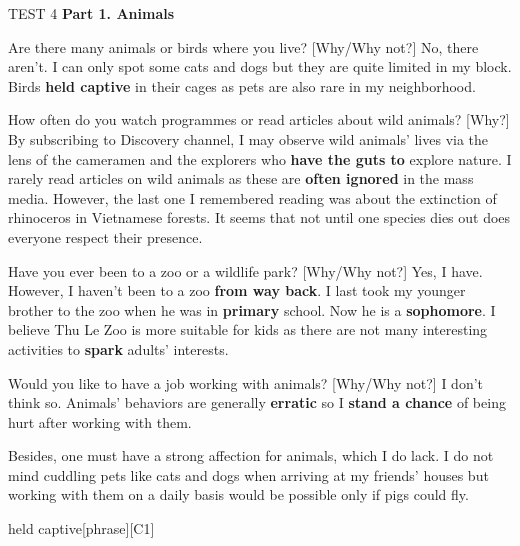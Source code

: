 \begin{glossarymc}[Cambridge 13]
    \begin{test}{TEST 4}
    \noindent
    \textbf{Part 1. Animals}
    \begin{qa}{Are there many animals or birds where you live? [Why/Why not?]}
    No, there aren’t. I can only spot some cats and dogs but they are quite limited in my block. Birds \textbf{held captive} in their cages as pets are also rare in my neighborhood.
    \end{qa}

    \begin{qa}{How often do you watch programmes or read articles about wild animals? [Why?]}
    By subscribing to Discovery channel, I may observe wild animals’ lives via the lens of the cameramen and the explorers who \textbf{have the guts to} explore nature. I rarely read articles on wild animals as these are \textbf{often ignored} in the mass media. However, the last one I remembered reading was about the extinction of rhinoceros in Vietnamese forests. It seems that not until one species dies out does everyone respect their presence.
    \end{qa}

    \begin{qa}{Have you ever been to a zoo or a wildlife park? [Why/Why not?]}
    Yes, I have. However, I haven’t been to a zoo \textbf{from way back}. I last took my younger brother to the zoo when he was in \textbf{primary} school. Now he is a \textbf{sophomore}. I believe Thu Le Zoo is more suitable for kids as there are not many interesting activities to \textbf{spark} adults’ interests.
    \end{qa}

    \begin{qa}{Would you like to have a job working with animals? [Why/Why not?]}
    I don’t think so. Animals’ behaviors are generally \textbf{erratic} so I \textbf{stand a chance} of being hurt after working with them. 

    Besides, one must have a strong affection for animals, which I do lack. I do not mind cuddling pets like cats and dogs when arriving at my friends’ houses but working with them on a daily basis would be possible only if pigs could fly.
    \end{qa}

        \begin{VocabExplain}[Part 1]
            \begin{ExplainCard}{held captive}[phrase][C1]
            \end{ExplainCard}


\end{VocabExplain}
\end{test}
\end{glossarymc}
